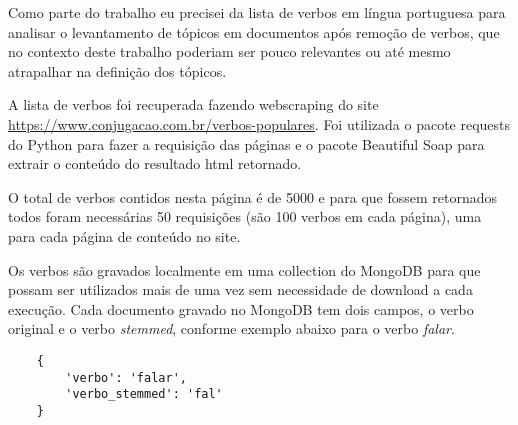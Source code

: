 Como parte do trabalho eu precisei da lista de verbos em língua portuguesa para analisar o levantamento de tópicos em documentos após remoção de verbos, 
que no contexto deste trabalho poderiam ser pouco relevantes ou até mesmo atrapalhar na definição dos tópicos.

A lista de verbos foi recuperada fazendo webscraping do site \url{https://www.conjugacao.com.br/verbos-populares}. Foi utilizada o pacote requests do Python 
para fazer a requisição das páginas e o pacote Beautiful Soap para extrair o conteúdo do resultado html retornado.

O total de verbos contidos nesta página é de 5000 e para que fossem retornados todos foram necessárias 50 requisições (são 100 verbos em cada página), 
uma para cada página de conteúdo no site.

Os verbos são gravados localmente em uma collection do MongoDB para que possam ser utilizados mais de uma vez sem necessidade de download a cada execução.
Cada documento gravado no MongoDB tem dois campos, o verbo original e o verbo \textit{stemmed}, conforme exemplo abaixo para o verbo \textit{falar}.

\begin{lstlisting}
    {
        'verbo': 'falar',
        'verbo_stemmed': 'fal'
    }
\end{lstlisting}

\begin{comment}
\subsection{Melhores Destinos}

Obtenção de posts com conteúdo de promoções do blog Melhores Destinos.    
\end{comment}
